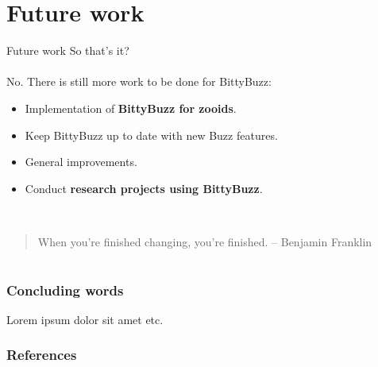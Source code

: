 \documentclass{beamer}
\begin{document}
	\section{Future work}
	\begin{frame}{Future work}
		So that's it?\\
		~\\
		No. There is still more work to be done for BittyBuzz:
		\begin{itemize}
			\item Implementation of \textbf{BittyBuzz for zooids}.
			\item Keep BittyBuzz up to date with new Buzz features.
			\item General improvements.
			\item Conduct \textbf{research projects using BittyBuzz}.
		\end{itemize}
		~\\
		\begin{quote}
			When you're finished changing, you're finished. -- Benjamin Franklin
		\end{quote}
	\end{frame}
	\section*{}
	\begin{frame}
		\frametitle{Concluding words}
		Lorem ipsum dolor sit amet etc.
	\end{frame}
	\begin{frame}[allowframebreaks]
		\frametitle{References}
		
		
	\end{frame}
\end{document}
